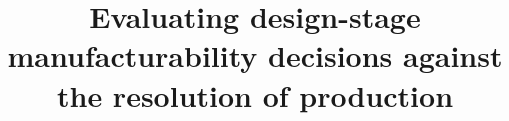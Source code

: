 \documentclass[pdflatex,sn-basic,lineno]{sn-jnl}
\newif\ifanon
\providecommand{\DIFdelbegin}{} %
\newcommand{\DIFscaledelfig}{0.5}
\newlength{\DIFdelgraphicswidth} %
\newlength{\DIFdelgraphicsheight} %
\newcommand{\DIFdelincludegraphics}[2][]{%
\sbox{\DIFdelgraphicsbox}{\DIFOincludegraphics[#1]{#2}}%
\settoboxwidth{\DIFdelgraphicswidth}{\DIFdelgraphicsbox} %
\settoboxtotalheight{\DIFdelgraphicsheight}{\DIFdelgraphicsbox} %
\scalebox{\DIFscaledelfig}{%
\parbox[b]{\DIFdelgraphicswidth}{\usebox{\DIFdelgraphicsbox}\\[-\baselineskip] \rule{\DIFdelgraphicswidth}{0em}}\llap{\resizebox{\DIFdelgraphicswidth}{\DIFdelgraphicsheight}{%
\setlength{\unitlength}{\DIFdelgraphicswidth}%
\begin{picture}(1,1)%
\thicklines\linethickness{2pt} %
{\color[rgb]{1,0,0}\put(0,0){\framebox(1,1){}}}%
{\color[rgb]{1,0,0}\put(0,0){\line( 1,1){1}}}%
{\color[rgb]{1,0,0}\put(0,1){\line(1,-1){1}}}%
\end{picture}%
}\hspace*{3pt}}} %
} %
\DeclareRobustCommand{\DIFdelbegin}{\DIFOdelbegin \let\includegraphics\DIFdelincludegraphics} %
\begin{document}
\title[Evaluating design-stage manufacturability decisions]{Evaluating design-stage manufacturability decisions against the resolution of production}

\ifanon
\author*[1]{\fnm{Anonymised} \sur{for review}}
\affil*[1]{\orgname{Affiliation withheld for review}}
\else
\author*[1]{ }

\fi

\DIFdelbegin %
\end{document}
